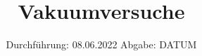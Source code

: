 

\subject{V70}
\title{Vakuumversuche}
\date{%
  Durchführung: 08.06.2022
  \hspace{3em}
  Abgabe: DATUM
}



\maketitle
\thispagestyle{empty}
\tableofcontents
\newpage







\nocite{*}
\printbibliography{}



